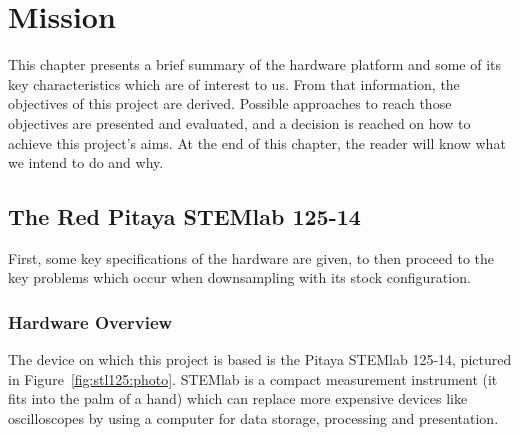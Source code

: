 \chapter{Mission} %
\label{ch:mission}

This chapter presents a brief summary of the hardware platform and some of its
key characteristics  which are of  interest to us. From that  information, the
objectives of  this project  are derived. Possible  approaches to  reach those
objectives are  presented and evaluated, and  a decision is reached  on how to
achieve this project's aims. At the end  of this chapter, the reader will know
what we intend to do and why.


\section{The Red Pitaya STEMlab 125-14} %
\label{sec:stl125}

First, some key  specifications of the hardware are given,  to then proceed to
the key problems which occur when downsampling with its stock configuration.


\subsection{Hardware Overview} %
\label{subsec:stl125:hardware_overview}

The  device on  which this  project  is based  is the  Pitaya STEMlab  125-14,
pictured  in Figure~\ref{fig:stl125:photo}. STEMlab  is a  compact measurement
instrument (it fits into the palm of  a hand) which can replace more expensive
devices like  oscilloscopes by using  a computer for data  storage, processing
and presentation.

